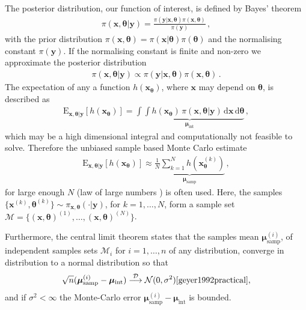 The posterior distribution, our function of interest, is defined by Bayes' theorem
\begin{align}
	\pi(\bm{x},\bm{\theta}|\bm{y}) = \frac{ \pi(\bm{y} | \bm{x}, \bm{\theta} ) \pi(\bm{x}, \bm{\theta})}{\pi(\bm{y})} \, ,
\end{align}
with the prior distribution $\pi(\bm{x}, \bm{\theta}) = \pi(\bm{x}| \bm{\theta}) \pi(\bm{\theta}) $ and the normalising constant $\pi(\bm{y})$.
If the normalising constant is finite and non-zero we approximate the posterior distribution
\begin{align}
	\pi(\bm{x},\bm{\theta}|\bm{y}) \propto \pi(\bm{y} | \bm{x}, \bm{\theta} ) \pi(\bm{x}, \bm{\theta}) \, .
\end{align}
The expectation of any a function $h(\bm{x}_{\bm{\theta}})$, where $\bm{x}$ may depend on $\bm{\theta}$, is described as 
\begin{align}
	\text{E}_{\bm{x},\bm{\theta}|\bm{y}} [h(\bm{x}_{\bm{\theta}})] =  \underbrace{\int \int   h(\bm{x}_{\bm{\theta}}) \,  \pi(\bm{x}, \bm{\theta} | \bm{y} ) \, \text{d} \bm{x}  \, \text{d} \bm{\theta}}_{\bm{\mu}_{\text{int}}}   \label{eq:expPos} \, ,
\end{align}
which may be a high dimensional integral and computationally not feasible to solve.
Therefore the unbiased \cite{roberts2004general} sample based Monte Carlo estimate
\begin{align}
	\label{eq:sampMean}
	\text{E}_{\bm{x},\bm{\theta}|\bm{y}} [h(\bm{x}_{\bm{\theta}})] \approx \underbrace{ \frac{1}{N} \sum_{k=1}^{N} h(\bm{x}^{(k)}_{\bm{\theta}})  }_{\bm{\mu}_{\text{samp}}} \, ,
\end{align}
for large enough $N$ (law of large numbers \cite[Chapter 17]{tweedie2009measprob}) is often used.
Here, the samples $\{\bm{x}^{(k)},\bm{\theta}^{(k)} \}\sim \pi_{\bm{x}, \bm{\theta}}(\cdot|\bm{y})$, for $k = 1, \dots, N$, form a sample set $\mathcal{M} =\{ (\bm{x},\bm{\theta})^{(1)}, \dots ,  (\bm{x},\bm{\theta})^{(N)} \}$.


Furthermore, the central limit theorem states that the samples mean $ \bm{\mu}^{(i)}_{\text{samp}} $, of independent samples sets $\mathcal{M}_i$ for $i = 1, \dots, n$ of any distribution, converge in distribution to a normal distribution so that
\begin{align}
	\sqrt{n} (\bm{\mu}^{(i)}_{\text{samp}} -  \bm{\mu}_{\text{int}} ) \overset{\mathcal{D}}{\longrightarrow} \mathcal{N} (0,\sigma^2) \text{\cite{geyer1992practical}},
\end{align}
and if $\sigma^2 < \infty$ the Monte-Carlo error $\bm{\mu}^{(i)}_{\text{samp}} -  \bm{\mu}_{\text{int}} $ is bounded.

